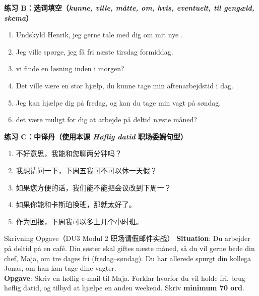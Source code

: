 \textbf{练习 B：选词填空（\textit{kunne, ville, måtte, om, hvis, eventuelt, til gengæld, skema}）}
\begin{enumerate}
  \item Undskyld Henrik, jeg \underline{\hspace{1.6cm}} gerne tale med dig om mit nye \underline{\hspace{1.6cm}}.
  \item Jeg ville spørge, \underline{\hspace{1.4cm}} jeg \underline{\hspace{1.6cm}} få fri næste tirsdag formiddag.
  \item \underline{\hspace{1.6cm}} vi \underline{\hspace{2.0cm}} finde en løsning inden i morgen?
  \item Det ville være en stor hjælp, \underline{\hspace{1.4cm}} du kunne tage min aftenarbejdstid i dag.
  \item Jeg kan hjælpe dig på fredag, og \underline{\hspace{2.2cm}} kan du tage min vagt på søndag.
  \item \underline{\hspace{1.6cm}} det være muligt for dig at arbejde på deltid næste måned?
\end{enumerate}

\textbf{练习 C：中译丹（使用本课 \textit{Høflig datid} 职场委婉句型）}
\begin{enumerate}
  \item 不好意思，我能和您聊两分钟吗？
  \item 我想请问一下，下周五我可不可以休一天假？
  \item 如果您方便的话，我们能不能把会议改到下周一？
  \item 如果你能和卡斯珀换班，那就太好了。
  \item 作为回报，下周我可以多上几个小时班。
\end{enumerate}


\begin{emailbox}{Skrivning Opgave（DU3 Modul 2 职场请假邮件实战）}
\textbf{Situation}: Du arbejder på deltid på en café. Din søster skal giftes næste måned, så du vil gerne bede din chef, Maja, om tre dages fri (fredag--søndag). Du har allerede spurgt din kollega Jonas, om han kan tage dine vagter.\\
\textbf{Opgave}: Skriv en høflig e-mail til Maja. Forklar hvorfor du vil holde fri, brug høflig datid, og tilbyd at hjælpe en anden weekend. Skriv \textbf{minimum 70 ord}.
\end{emailbox}

